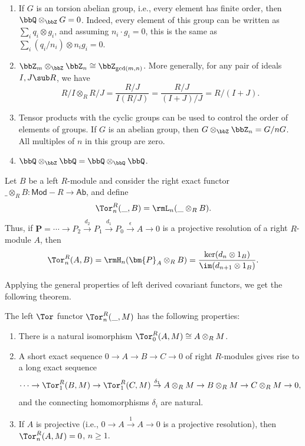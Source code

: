 \begin{example}\label{ex properties of ideals}
    \begin{enumerate}
        \item If $G$ is an torsion abelian group, i.e., every element has finite order, then $\bbQ\otimes_\bbZ G=0$. Indeed, every element of this group can be written as $\sum_i q_i\otimes g_i$, and assuming $n_i\cdot g_i=0$, this is the same as $\sum_i (q_i/n_i)\otimes n_ig_i=0$.
        \item $\bbZ_m\otimes_\bbZ \bbZ_n\cong \bbZ_{\gcd(m,n)}$. More generally, for any pair of ideals $I,J\sub R$, we have
         \[R\slash I\otimes_R R\slash J=\frac{R\slash J}{I(R\slash J)}=\frac{R\slash J}{(I+J)/J}=R\slash(I+J).\]
        \item Tensor products with the cyclic groups can be used to control the order of elements of groups. If $G$ is an abelian group, then $G\otimes_\bbZ \bbZ_n=G\slash nG$. All multiples of $n$ in this group are zero.
        \item $\bbQ\otimes_\bbZ\bbQ=\bbQ\otimes_\bbQ\bbQ$. 
    \end{enumerate}
\end{example}


\begin{defn}
    Let $B$ be a left $R$-module and consider the right exact functor $\_\otimes_R B:\mathsf{Mod-}R\to \mathsf{Ab}$, and define
    \[\Tor_n^R(\_,B)=\rmL_n(\_\otimes_R B).\]
    Thus, if $\bm{P}=\cdots\to P_2\overset{d_2}{\to}P_1\overset{d_1}{\to}P_0\overset{\epsilon}{\to}A\to 0$ is a projective resolution of a right $R$-module $A$, then
    \[\Tor_n^R(A,B)=\rmH_n(\bm{P}_A\otimes_R B)=\frac{\ker(d_n\otimes 1_B)}{\im(d_{n+1}\otimes 1_B)}.\]
\end{defn}

Applying the general properties of left derived covariant functors, we get the following theorem.

\begin{thm}\label{thm Tor properties}
    The left $\Tor$ functor $\Tor_n^R(\_,M)$ has the following properties:
    \begin{enumerate}
        \item There is a natural isomorphism $\Tor_0^R(A,M)\cong A\otimes_R M$.
        \item A short exact sequence $0\to A\to B\to C\to 0$ of right $R$-modules gives rise to a long exact sequence 
        \[\cdots\to \Tor_1^R(B,M)\to \Tor_1^R(C,M)\overset{\delta_1}{\to} A\otimes_R M\to B\otimes_R M\to C\otimes_R M\to 0,\]
        and the connecting homomorphisms $\delta_i$ are natural.
        \item If $A$ is projective (i.e., $0\to A\overset{1}{\to} A\to 0$ is a projective resolution), then $\Tor_n^R(A,M)=0$, $n\geq 1$.
    \end{enumerate}
\end{thm}

